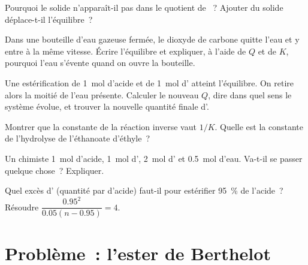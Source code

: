\begin{exercise}[$\star\star$]\label{exo:g12:equilibrium:10}
Pourquoi le solide n'apparaît-il pas dans le quotient de
~? Ajouter du solide déplace-t-il
l'équilibre~?
\end{exercise}

\begin{exercise}[$\star\star$]\label{exo:g12:equilibrium:11}
Dans une bouteille d'eau gazeuse fermée, le dioxyde de carbone quitte
l'eau et y entre à la même vitesse. Écrire l'équilibre
 et expliquer, à l'aide de $Q$ et de $K$,
pourquoi l'eau s'évente quand on ouvre la bouteille.
\end{exercise}

\begin{exercise}[$\star\star\star$]\label{exo:g12:equilibrium:12}
Une estérification de \qty{1}{mol} d'acide et de \qty{1}{mol} d'
atteint l'équilibre. On retire alors la moitié de l'eau présente.
Calculer le nouveau $Q$, dire dans quel sens le système évolue, et
trouver la nouvelle quantité finale d'.
\end{exercise}

\begin{exercise}[$\star\star\star$]\label{exo:g12:equilibrium:13}
Montrer que la constante de la réaction inverse vaut $1/K$. Quelle est
la constante de l'hydrolyse de l'éthanoate d'éthyle~?
\end{exercise}

\begin{exercise}[$\star\star\star$]\label{exo:g12:equilibrium:14}
Un chimiste  \qty{1}{mol} d'acide, \qty{1}{mol} d',
\qty{2}{mol} d' et \qty{0.5}{mol} d'eau. Va-t-il se passer quelque
chose~? Expliquer.
\end{exercise}

\begin{exercise}[$\star\star\star$]\label{exo:g12:equilibrium:15}
Quel excès d' (quantité par  d'acide) faut-il pour estérifier
\qty{95}{\percent} de l'acide~? Résoudre $\dfrac{0.95^2}{0.05(n - 0.95)} =
4$.
\end{exercise}

\section{Problème~: l'ester de Berthelot}

